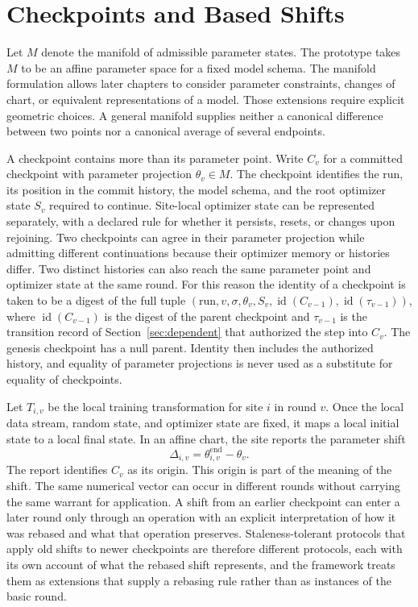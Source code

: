 \documentclass[11pt]{article}
\theoremstyle{definition}
\theoremstyle{remark}
\begin{document}
\section{Checkpoints and Based Shifts}

Let $M$ denote the manifold of admissible parameter states. The prototype takes $M$ to be an affine parameter space for a fixed model schema. The manifold formulation allows later chapters to consider parameter constraints, changes of chart, or equivalent representations of a model. Those extensions require explicit geometric choices. A general manifold supplies neither a canonical difference between two points nor a canonical average of several endpoints.

A checkpoint contains more than its parameter point. Write $C_v$ for a committed checkpoint with parameter projection $\theta_v\in M$. The checkpoint identifies the run, its position in the commit history, the model schema, and the root optimizer state $S_v$ required to continue. Site-local optimizer state can be represented separately, with a declared rule for whether it persists, resets, or changes upon rejoining. Two checkpoints can agree in their parameter projection while admitting different continuations because their optimizer memory or histories differ. Two distinct histories can also reach the same parameter point and optimizer state at the same round. For this reason the identity of a checkpoint is taken to be a digest of the full tuple $(\text{run},v,\sigma,\theta_v,S_v,\operatorname{id}(C_{v-1}),\operatorname{id}(\tau_{v-1}))$, where $\operatorname{id}(C_{v-1})$ is the digest of the parent checkpoint and $\tau_{v-1}$ is the transition record of Section~\ref{sec:dependent} that authorized the step into $C_v$. The genesis checkpoint has a null parent. Identity then includes the authorized history, and equality of parameter projections is never used as a substitute for equality of checkpoints.

Let $T_{i,v}$ be the local training transformation for site $i$ in round $v$. Once the local data stream, random state, and optimizer state are fixed, it maps a local initial state to a local final state. In an affine chart, the site reports the parameter shift
\[
\Delta_{i,v}=\theta_{i,v}^{\mathrm{end}}-\theta_v .
\]
The report identifies $C_v$ as its origin. This origin is part of the meaning of the shift. The same numerical vector can occur in different rounds without carrying the same warrant for application. A shift from an earlier checkpoint can enter a later round only through an operation with an explicit interpretation of how it was rebased and what that operation preserves. Staleness-tolerant protocols that apply old shifts to newer checkpoints are therefore different protocols, each with its own account of what the rebased shift represents, and the framework treats them as extensions that supply a rebasing rule rather than as instances of the basic round.
\end{document}
